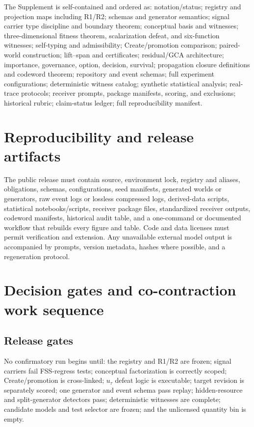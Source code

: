 \documentclass[11pt]{article}
\begin{document}
The Supplement is self-contained and ordered as: notation/status; registry and projection maps including R1/R2; schemas and generator semantics; signal carrier type discipline and boundary theorem; conceptual basis and witnesses; three-dimensional fitness theorem, scalarization defeat, and six-function witnesses; self-typing and admissibility; Create/promotion comparison; paired-world construction; lift--span and certificates; residual/GCA architecture; importance, governance, option, decision, survival; propagation closure definitions and codeword theorem; repository and event schemas; full experiment configurations; deterministic witness catalog; synthetic statistical analysis; real-trace protocols; receiver prompts, package manifests, scoring, and exclusions; historical rubric; claim-status ledger; full reproducibility manifest.

\section{Reproducibility and release artifacts}

The public release must contain source, environment lock, registry and aliases, obligations, schemas, configurations, seed manifests, generated worlds or generators, raw event logs or lossless compressed logs, derived-data scripts, statistical notebooks/scripts, receiver package files, standardized receiver outputs, codeword manifests, historical audit table, and a one-command or documented workflow that rebuilds every figure and table. Code and data licenses must permit verification and extension. Any unavailable external model output is accompanied by prompts, version metadata, hashes where possible, and a regeneration protocol.

\section{Decision gates and co-contraction work sequence}

\subsection{Release gates}

No confirmatory run begins until: the registry and R1/R2 are frozen; signal carriers fail FSS-regress tests; conceptual factorization is correctly scoped; Create/promotion is cross-linked; $u_\tau$ defeat logic is executable; target revision is separately scored; one generator and event schema pass replay; hidden-resource and split-generator detectors pass; deterministic witnesses are complete; candidate models and test selector are frozen; and the unlicensed quantity bin is empty.
\end{document}
